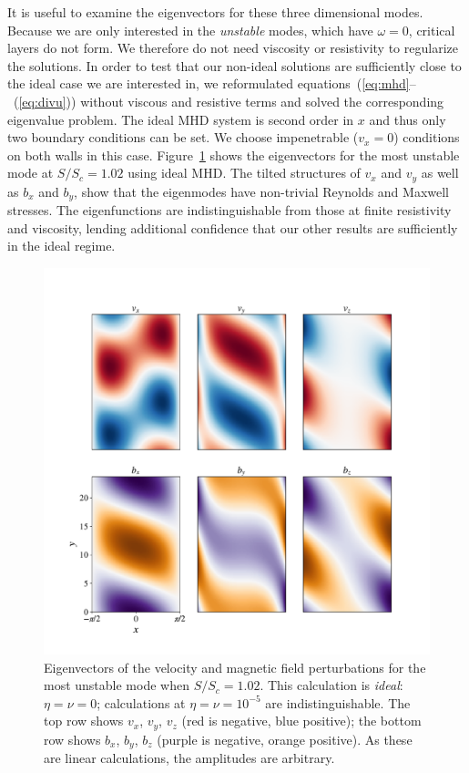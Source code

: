 \documentclass[aps,prl,reprint,superscriptaddress]{revtex4-1}
\newcommand{\SSC}{S/S_{c}}
\begin{document}
It is useful to examine the eigenvectors for these three dimensional modes.
Because we are only interested in the \emph{unstable} modes, which have $\omega = 0$, critical layers do not form.
We therefore do not need viscosity or resistivity to regularize the solutions.
In order to test that our non-ideal solutions are sufficiently close to the ideal case we are interested in, we reformulated equations~(\ref{eq:mhd}--~(\ref{eq:divu})) without viscous and resistive terms and solved the corresponding eigenvalue problem.
The ideal MHD system is second order in $x$ and thus only two boundary conditions can be set.
We choose impenetrable ($v_x = 0$) conditions on both walls in this case.
Figure~\ref{fig:eigvec} shows the eigenvectors for the most unstable mode at $\SSC = 1.02$ using ideal MHD. 
The tilted structures of $v_x$ and $v_y$ as well as $b_x$ and $b_y$, show that the eigenmodes have non-trivial Reynolds and Maxwell stresses.
The eigenfunctions are indistinguishable from those at finite resistivity and viscosity, lending additional confidence that our other results are sufficiently in the ideal regime.

\begin{figure}[h!]
  \centering
  \includegraphics[width=\columnwidth]{eigvecs_xy_run_11_ideal_single_mode.pdf}
  \caption{Eigenvectors of the velocity and magnetic field perturbations for the most unstable mode when $\SSC = 1.02$. This calculation is \emph{ideal}: $\eta = \nu = 0$; calculations at $\eta = \nu = 10^{-5}$ are indistinguishable.  The top row shows $v_x$, $v_y$, $v_z$ (red is negative, blue positive); the bottom row shows $b_x$, $b_y$, $b_z$ (purple is negative, orange positive). As these are linear calculations, the amplitudes are arbitrary.}
  \label{fig:eigvec}
\end{figure}
\end{document}
